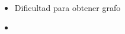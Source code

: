 \begin{conclusion}
\label{chap:conclu}
\begin{itemize}
    \item Dificultad para obtener grafo
    \item 
\end{itemize}
\end{conclusion}
